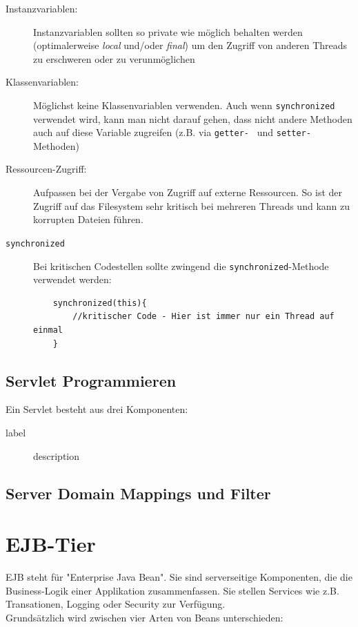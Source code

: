 \documentclass[a4paper, 11pt]{article}
\begin{document}
\begin{description}
	\item[Instanzvariablen: ] Instanzvariablen sollten so private wie möglich behalten werden (optimalerweise \textit{local} und/oder \textit{final}) um den Zugriff von anderen Threads zu erschweren oder zu verunmöglichen
	\item[Klassenvariablen: ] Möglichst keine Klassenvariablen verwenden. Auch wenn \texttt{synchronized} verwendet wird, kann man nicht darauf gehen, dass nicht andere Methoden auch auf diese Variable zugreifen (z.B. via \texttt{getter- } und \texttt{setter-} Methoden)
	\item[Ressourcen-Zugriff: ] Aufpassen bei der Vergabe von Zugriff auf externe Ressourcen. So ist der Zugriff auf das Filesystem sehr kritisch bei mehreren Threads und kann zu korrupten Dateien führen.
	\item[\texttt{synchronized}] Bei kritischen Codestellen sollte zwingend die \texttt{synchronized}-Methode verwendet werden:
	
	\begin{lstlisting}
	synchronized(this){
		//kritischer Code - Hier ist immer nur ein Thread auf einmal
	}
	\end{lstlisting}
\end{description}

\subsection{Servlet Programmieren}
Ein Servlet besteht aus drei Komponenten:

\begin{description}
	\item[label] description
\end{description}

\subsection{Server Domain Mappings und Filter}


\section{EJB-Tier}

EJB steht für "Enterprise Java Bean". Sie sind serverseitige Komponenten, die die Business-Logik einer Applikation zusammenfassen. Sie  stellen Services wie z.B. Transationen, Logging oder Security zur Verfügung. \\
Grundsätzlich wird zwischen vier Arten von Beans unterschieden:
\end{document}
